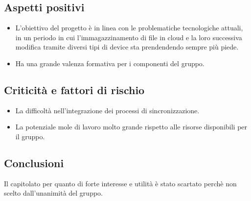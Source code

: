 \subsection{Aspetti positivi}
\begin{itemize}
    \item L'obiettivo del progetto è in linea con le problematiche tecnologiche attuali, in un periodo in cui l'immagazzinamento di file in cloud e la loro successiva modifica tramite diversi tipi di device sta prendendendo sempre più piede.
    \item Ha una grande valenza formativa per i componenti del gruppo.
\end{itemize}
\subsection{Criticità e fattori di rischio}
\begin{itemize}
    \item La difficoltà nell'integrazione dei processi di sincronizzazione.
    \item La potenziale mole di lavoro molto grande rispetto alle risorse disponibili per il gruppo.
\end{itemize}
\subsection{Conclusioni}
Il capitolato per quanto di forte interesse e utilità è stato scartato perchè non scelto dall'unanimità del gruppo.
